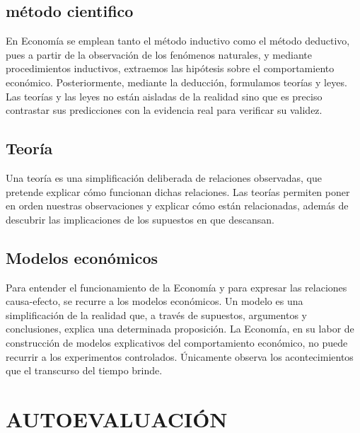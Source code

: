\documentclass[12pt]{book}
\begin{document}
\section{método cientifico}
En Economía se emplean tanto el método inductivo como el método deductivo, pues a partir de la observación de los fenómenos naturales, y mediante procedimientos inductivos, extraemos las hipótesis sobre el comportamiento económico. Posteriormente,
mediante la deducción, formulamos teorías y leyes.
Las teorías y las leyes no están aisladas de la realidad sino que es preciso contrastar sus predicciones con la evidencia real para verificar su validez.

\section{Teoría}
Una teoría es una simplificación deliberada de relaciones observadas, que pretende explicar cómo funcionan dichas relaciones. Las teorías permiten poner en orden nuestras observaciones y explicar cómo están relacionadas, además de descubrir las implicaciones de los supuestos en que descansan.

\section{Modelos económicos}
Para entender el funcionamiento de la Economía y para expresar las relaciones causa-efecto, se recurre a los modelos económicos. Un modelo es una simplificación de la realidad que, a través de supuestos, argumentos y conclusiones, explica una determinada
proposición. La Economía, en su labor de construcción de modelos explicativos del comportamiento económico, no puede recurrir a los experimentos controlados. Únicamente observa los acontecimientos que el transcurso del tiempo brinde.


\chapter{AUTOEVALUACIÓN}
\end{document}
